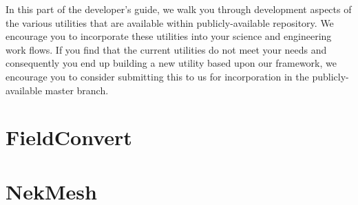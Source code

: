 
In this part of the developer's guide, we walk you through development
aspects of the various utilities that are available within
publicly-available \nek repository.  We encourage you to incorporate
these utilities into your science and engineering work flows.  If you
find that the current utilities do not meet your needs and
consequently you end up building a new utility based upon our
framework, we encourage you to consider submitting this to us for
incorporation in the publicly-available master branch.


\chapter{FieldConvert}




\chapter{NekMesh}




